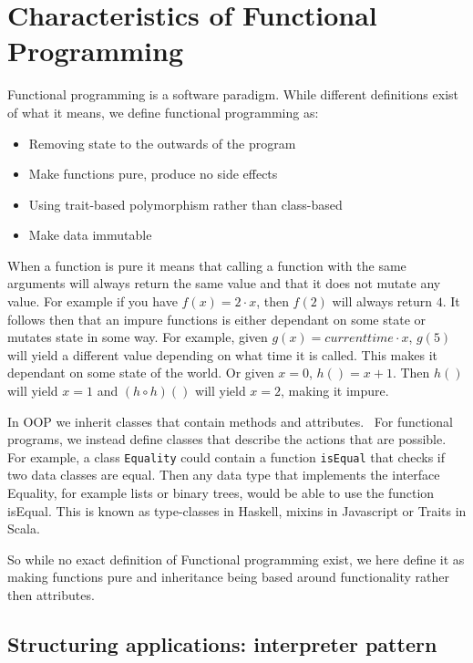 \documentclass[12pt]{report}
\theoremstyle{definition}
\theoremstyle{theorem}
\begin{document}
\section{Characteristics of Functional Programming}

Functional programming is a software paradigm. While different definitions exist
of what it means, we define functional programming as:

\begin{itemize}
    \item Removing state to the outwards of the program
    \item Make functions pure, produce no side effects
    \item Using trait-based polymorphism rather than class-based
    \item Make data immutable
\end{itemize}

When a function is pure it means that calling a function with the same arguments
will always return the same value and that it does not mutate any value. For
example if you have $f(x) = 2\cdot x$, then $f(2)$ will always return $4$. It
follows then that an impure functions is either dependant on some state or
mutates state in some way. For example, given $g(x) = currenttime \cdot x$,
$g(5)$ will yield a different value depending on what time it is called. This
makes it dependant on some state of the world. Or given $x=0$, $h()=x+1$. Then
$h()$ will yield $x=1$ and $(h \circ h)()$ will yield $x=2$, making it
impure.~\cite{wikipedia_pure}

In OOP we inherit classes that contain methods and
attributes.~\cite{Gamma:1995:DPE:186897} For functional programs, we instead
define classes that describe the actions that are possible. For example, a class
\texttt{Equality} could contain a function \texttt{isEqual} that checks if two
data classes are equal. Then any data type that implements the interface
Equality, for example lists or binary trees, would be able to use the function
isEqual. This is known as type-classes in Haskell, mixins in Javascript or
Traits in Scala.

So while no exact definition of Functional programming exist, we here define it
as making functions pure and inheritance being based around functionality rather
then attributes.

\subsection{Structuring applications: interpreter pattern}
\end{document}

